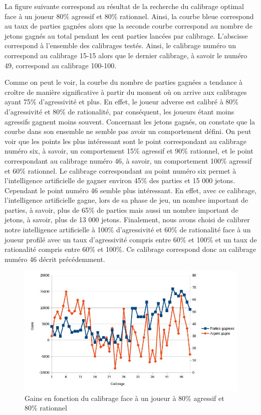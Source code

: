 \documentclass{report}
\begin{document}
La figure suivante correspond au résultat de la recherche du calibrage optimal face à un joueur 80\% agressif et 80\% rationnel. Ainsi, la courbe bleue correspond au taux de parties gagnées alors que la seconde courbe correspond au nombre de jetons gagnés au total pendant les cent parties lancées par calibrage. L'abscisse correspond à l'ensemble des calibrages testés. Ainsi, le calibrage numéro un correspond au calibrage 15-15 alors que le dernier calibrage, à savoir le numéro 49, correspond au calibrage 100-100.

Comme on peut le voir, la courbe du nombre de parties gagnées a tendance à croître de manière significative à partir du moment où on arrive aux calibrages ayant 75\% d'agressivité et plus. En effet, le joueur adverse est calibré à 80\% d'agressivité et 80\% de rationalité, par conséquent, les joueurs étant moins agressifs gagnent moins souvent. Concernant les jetons gagnés, on constate que la courbe dans son ensemble ne semble pas avoir un comportement défini. 
On peut voir que les points les plus intéressant sont le point correspondant au calibrage numéro six, à savoir, un comportement 15\% agressif et 90\% rationnel, et le point correspondant au calibrage numéro 46, à savoir, un comportement 100\% agressif et 60\% rationnel. Le calibrage correspondant au point numéro six permet à l'intelligence artificielle de gagner environ 45\% des parties et 15 000 jetons. Cependant le point numéro 46 semble plus intéressant. En effet, avec ce calibrage, l'intelligence artificielle gagne, lors de sa phase de jeu, un nombre important de parties, à savoir, plus de 65\% de parties mais aussi un nombre important de jetons, à savoir, plus de 13 000 jetons. Finalement, nous avons choisi de calibrer notre intelligence artificielle à 100\% d'agressivité et 60\% de rationalité face à un joueur profilé avec un taux d'agressivité compris entre 60\% et 100\% et un taux de rationalité compris entre 60\% et 100\%. Ce calibrage correspond donc au calibrage numéro 46 décrit précédemment. \par


\begin{figure}[H]
	\begin{center}
		\includegraphics[scale=0.5]{./imagesRapport/rechercheCalibrageOptimal8080.jpg}
	\end{center}
	\caption{Gains en fonction du calibrage face à un joueur à 80\% agressif et 80\% rationnel}
\end{figure}
\end{document}
